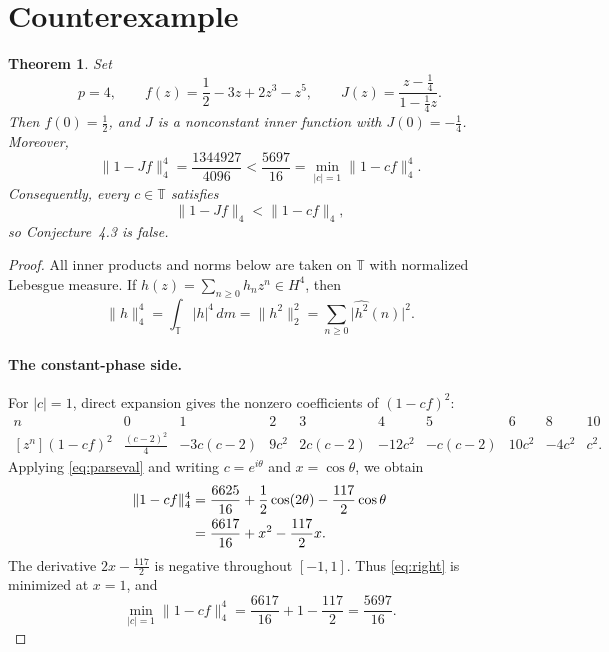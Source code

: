\documentclass[11pt]{article}
\newtheorem{theorem}{Theorem}
\newcommand{\T}{\mathbb T}
\begin{document}
\section{Counterexample}

\begin{theorem}
Set
\[
 p=4,\qquad
 f(z)=\frac12-3z+2z^3-z^5,\qquad
 J(z)=\frac{z-\frac14}{1-\frac14z}.
\]
Then \(f(0)=\frac12\), and \(J\) is a nonconstant inner function with
\(J(0)=-\frac14\).  Moreover,
\[
 \lVert1-Jf\rVert_4^4=\frac{1344927}{4096}
 <\frac{5697}{16}
 =\min_{|c|=1}\lVert1-cf\rVert_4^4.
\]
Consequently, every \(c\in\T\) satisfies
\[
       \lVert1-Jf\rVert_4<\lVert1-cf\rVert_4,
\]
so Conjecture~4.3 is false.
\end{theorem}

\begin{proof}
All inner products and norms below are taken on \(\T\) with normalized
Lebesgue measure.  If \(h(z)=\sum_{n\ge0}h_nz^n\in H^4\), then
\begin{equation}\label{eq:parseval}
 \lVert h\rVert_4^4
 =\int_{\T}|h|^4\,dm
 =\lVert h^2\rVert_2^2
 =\sum_{n\ge0}\bigl|\widehat{h^2}(n)\bigr|^2.
\end{equation}

\paragraph{The constant-phase side.}
For \(|c|=1\), direct expansion gives the nonzero coefficients of
\((1-cf)^2\):
\[
\begin{array}{c|rrrrrrrrr}
n&0&1&2&3&4&5&6&8&10\\ \hline
[z^n](1-cf)^2&
\frac{(c-2)^2}{4}&-3c(c-2)&9c^2&2c(c-2)&-12c^2&
-c(c-2)&10c^2&-4c^2&c^2 .
\end{array}
\]
Applying \eqref{eq:parseval} and writing \(c=e^{i\theta}\) and
\(x=\cos\theta\), we obtain
\begin{align}
\lVert1-cf\rVert_4^4
 &=\frac{6625}{16}
   +\frac12\cos(2\theta)-\frac{117}{2}\cos\theta \notag\\
 &=\frac{6617}{16}+x^2-\frac{117}{2}x. \label{eq:right}
\end{align}
The derivative \(2x-\frac{117}{2}\) is negative throughout
\([-1,1]\).  Thus \eqref{eq:right} is minimized at \(x=1\), and
\begin{equation}\label{eq:rightmin}
 \min_{|c|=1}\lVert1-cf\rVert_4^4
 =\frac{6617}{16}+1-\frac{117}{2}
 =\frac{5697}{16}.
\end{equation}


\end{proof}
\end{document}
